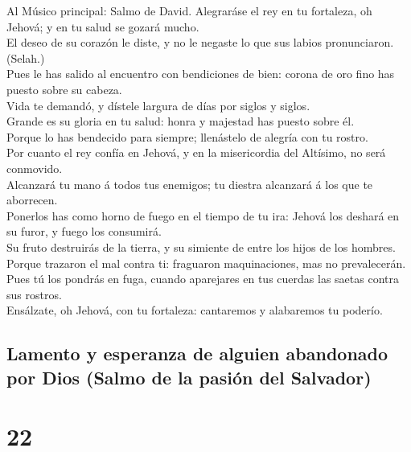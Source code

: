  Al Músico principal: Salmo de David. Alegraráse el rey en
tu fortaleza, oh Jehová; y en tu salud se gozará mucho.\\
 El deseo de su corazón le diste, y no le negaste lo que
sus labios pronunciaron. (Selah.)\\
 Pues le has salido al encuentro con bendiciones de bien:
corona de oro fino has puesto sobre su cabeza.\\
 Vida te demandó, y dístele largura de días por siglos y
siglos.\\
 Grande es su gloria en tu salud: honra y majestad has
puesto sobre él.\\
 Porque lo has bendecido para siempre; llenástelo de
alegría con tu rostro.\\
 Por cuanto el rey confía en Jehová, y en la misericordia
del Altísimo, no será conmovido.\\
 Alcanzará tu mano á todos tus enemigos; tu diestra
alcanzará á los que te aborrecen.\\
 Ponerlos has como horno de fuego en el tiempo de tu ira:
Jehová los deshará en su furor, y fuego los consumirá.\\
 Su fruto destruirás de la tierra, y su simiente de entre
los hijos de los hombres.\\
 Porque trazaron el mal contra ti: fraguaron
maquinaciones, mas no prevalecerán.\\
 Pues tú los pondrás en fuga, cuando aparejares en tus
cuerdas las saetas contra sus rostros.\\
 Ensálzate, oh Jehová, con tu fortaleza: cantaremos y
alabaremos tu poderío.

\hypertarget{lamento-y-esperanza-de-alguien-abandonado-por-dios-salmo-de-la-pasiuxf3n-del-salvador}{%
\subsection{Lamento y esperanza de alguien abandonado por Dios (Salmo de
la pasión del
Salvador)}\label{lamento-y-esperanza-de-alguien-abandonado-por-dios-salmo-de-la-pasiuxf3n-del-salvador}}

\hypertarget{section-19-22}{%
\section{22}\label{section-19-22}}


